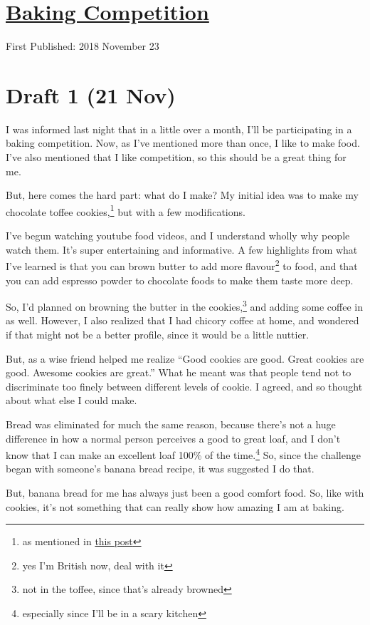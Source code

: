\documentclass[12pt]{article}[titlepage]
\newcommand{\say}[1]{``#1''}
\newcommand{\1}{\={a}}
\newcommand{\2}{\={e}}
\newcommand{\3}{\={\i}}
\newcommand{\4}{\=o}
\newcommand{\5}{\=u}
\newcommand{\6}{\={A}}
\renewcommand{\,}{\textsuperscript{,}}
\begin{document}
\doublespacing
\section{\href{baking-competition.html}{Baking Competition}}
First Published: 2018 November 23
\section{Draft 1 (21 Nov)}
I was informed last night that in a little over a month, I'll be participating in a baking competition.
Now, as I've mentioned more than once, I like to make food.
I've also mentioned that I like competition, so this should be a great thing for me.

But, here comes the hard part: what do I make?
My initial idea was to make my chocolate toffee cookies,\footnote{as mentioned in \href{toffee-recipe.html}{this post}} but with a few modifications.

I've begun watching youtube food videos, and I understand wholly why people watch them.
It's super entertaining and informative.
A few highlights from what I've learned is that you can brown butter to add more flavour\footnote{yes I'm British now, deal with it} to food, and that you can add espresso powder to chocolate foods to make them taste more deep.

So, I'd planned on browning the butter in the cookies,\footnote{not in the toffee, since that's already browned} and adding some coffee in as well.
However, I also realized that I had chicory coffee at home, and wondered if that might not be a better profile, since it would be a little nuttier.

But, as a wise friend helped me realize \say{Good cookies are good. Great cookies are good. Awesome cookies are great.}
What he meant was that people tend not to discriminate too finely between different levels of cookie.
I agreed, and so thought about what else I could make.

Bread was eliminated for much the same reason, because there's not a huge difference in how a normal person perceives a good to great loaf, and I don't know that I can make an excellent loaf 100\% of the time.\footnote{especially since I'll be in a scary kitchen}
So, since the challenge began with someone's banana bread recipe, it was suggested I do that.

But, banana bread for me has always just been a good comfort food.
So, like with cookies, it's not something that can really show how amazing I am at baking.
\end{document}
